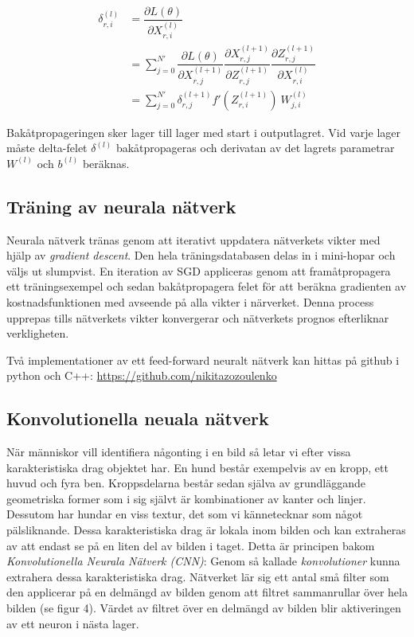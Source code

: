 \documentclass[a4paper,11pt,twoside]{article}
\newcommand*{\pd}[2]{\ensuremath{\dfrac{\partial #1}{\partial #2}}}
\begin{document}
\begin{equation}\label{dLdX_FCC}
\begin{split}
\delta^{(l)}_{r,i}
	& = \pd{L(\theta)}{X^{(l)}_{r,i}}  \\
	& = \sum^{N'}_{j=0} \pd{L(\theta)}{X^{(l+1)}_{r,j}} \pd{X^{(l+1)}_{r,j}}{Z^{(l+1)}_{r,j}} \pd{Z^{(l+1)}_{r,j}}{X^{(l)}_{r,i}} \\
	& = \sum^{N'}_{j=0} \delta^{(l+1)}_{r,j} f'(Z^{(l+1)}_{r,i}) \ W^{(l)}_{j,i} 
\end{split}
\end{equation}

Bakåtpropageringen sker lager till lager med start i outputlagret. Vid varje lager måste delta-felet $\delta^{(l)}$ bakåtpropageras och derivatan av det lagrets parametrar $W^{(l)}$ och $b^{(l)}$ beräknas. \cite{cs231n}

\subsection{Träning av neurala nätverk}
Neurala nätverk tränas genom att iterativt uppdatera nätverkets vikter med hjälp av \textit{gradient descent}. Den hela träningsdatabasen delas in i mini-hopar och väljs ut slumpvist. En iteration av SGD appliceras genom att framåtpropagera ett träningsexempel och sedan bakåtpropagera felet för att beräkna gradienten av kostnadsfunktionen med avseende på alla vikter i närverket. Denna process upprepas tills nätverkets vikter konvergerar och nätverkets prognos efterliknar verkligheten. \cite{cs231n}

Två implementationer av ett feed-forward neuralt nätverk kan hittas på github i python och C++: \url{https://github.com/nikitazozoulenko}

\subsection{Konvolutionella neuala nätverk}
När människor vill identifiera någonting i en bild så letar vi efter vissa karakteristiska drag objektet har. En hund består exempelvis av en kropp, ett huvud och fyra ben. Kroppsdelarna består sedan själva av grundläggande geometriska former som i sig självt är kombinationer av kanter och linjer. Dessutom har hundar en viss textur, det som vi kännetecknar som något pälsliknande. Dessa karakteristiska drag är lokala inom bilden och kan extraheras av att endast se på en liten del av bilden i taget. Detta är principen bakom \textit{Konvolutionella Neurala Nätverk (CNN)}: Genom så kallade \textit{konvolutioner} kunna extrahera dessa karakteristiska drag. Nätverket lär sig ett antal små filter som den applicerar på en delmängd av bilden genom att filtret sammanrullar över hela bilden (se figur 4). Värdet av filtret över en delmängd av bilden blir aktiveringen av ett neuron i nästa lager. \cite{cs231n}
\end{document}
